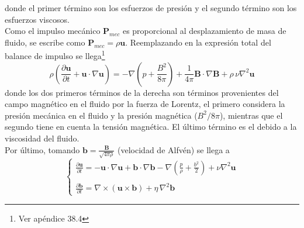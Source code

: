 donde el primer término son los esfuerzos de presión y el segundo término son los esfuerzos viscosos.\\
\indent Como el impulso mecánico $\textbf{P}_{mec}$ es proporcional al desplazamiento de masa de fluido, se escribe como $\textbf{P}_{mec} = \rho \textbf{u}$. Reemplazando en la expresión total del balance de impulso se llega\footnote{Ver apéndice 38.4}
\begin{equation*}
    \rho 
    \left(
        \frac{\partial \textbf{u}}{\partial t} 
        +
        \textbf{u}\cdot \nabla \textbf{u}
    \right)
    =
    -\nabla 
    \left(
        p + \frac{B^{2}}{8\pi}
    \right)
    +
    \frac{1}{4\pi} \textbf{B}\cdot \nabla \textbf{B} 
    +
    \rho\, \nu\nabla^{2}\textbf{u}
\end{equation*}
donde los dos primeros términos de la derecha son términos provenientes del campo magnético en el fluido por la fuerza de Lorentz, el primero considera la presión mecánica en el fluido y la presión magnética ($B^{2}/8\pi$), mientras que el segundo tiene en cuenta la tensión magnética. El último término es el debido a la viscosidad del fluido.\\
\indent Por último, tomando $\textbf{b} = \frac{\textbf{B}}{\sqrt{4\pi\rho}}$ (velocidad de Alfvén) se llega a
\begin{equation*}
    \left\{
        \begin{matrix}
            \frac{\partial \textbf{u}}{\partial t}
            = -\textbf{u}\cdot \nabla \textbf{u}
            + \textbf{b}\cdot \nabla \textbf{b}
            -\nabla
            \left(
                \frac{p}{\rho} + \frac{b^{2}}{2}
            \right)
            +
            \nu \nabla^{2}\textbf{u}\\
            \\
            \frac{\partial \textbf{b}}{\partial t} 
            = \nabla \times (\textbf{u}\times \textbf{b}) 
            + \eta\,\nabla^{2}\textbf{b}
        \end{matrix}
    \right.
\end{equation*}




